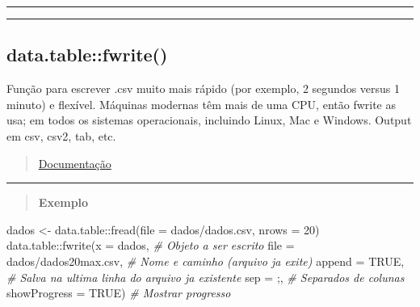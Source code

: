 \documentclass[
]{book}
\newenvironment{Shaded}{\begin{snugshade}}{\end{snugshade}}
\newcommand{\AttributeTok}[1]{\textcolor[rgb]{0.77,0.63,0.00}{#1}}
\newcommand{\CommentTok}[1]{\textcolor[rgb]{0.56,0.35,0.01}{\textit{#1}}}
\newcommand{\ConstantTok}[1]{\textcolor[rgb]{0.00,0.00,0.00}{#1}}
\newcommand{\DecValTok}[1]{\textcolor[rgb]{0.00,0.00,0.81}{#1}}
\newcommand{\FunctionTok}[1]{\textcolor[rgb]{0.00,0.00,0.00}{#1}}
\newcommand{\NormalTok}[1]{#1}
\newcommand{\OtherTok}[1]{\textcolor[rgb]{0.56,0.35,0.01}{#1}}
\newcommand{\SpecialCharTok}[1]{\textcolor[rgb]{0.00,0.00,0.00}{#1}}
\newcommand{\StringTok}[1]{\textcolor[rgb]{0.31,0.60,0.02}{#1}}
\theoremstyle{definition}
\theoremstyle{definition}
\theoremstyle{definition}
\theoremstyle{definition}
\theoremstyle{remark}
\begin{document}
\begin{center}\rule{0.5\linewidth}{0.5pt}\end{center}

\begin{center}\rule{0.5\linewidth}{0.5pt}\end{center}

\hypertarget{data.tablefwrite}{%
\subsection{data.table::fwrite()}\label{data.tablefwrite}}

Função para escrever .csv muito mais rápido (por exemplo, 2 segundos versus 1 minuto) e flexível. Máquinas modernas têm mais de uma CPU, então fwrite as usa; em todos os sistemas operacionais, incluindo Linux, Mac e Windows. Output em csv, csv2, tab, etc.

\begin{quote}
\href{https://www.rdocumentation.org/packages/data.table/versions/1.14.2/topics/fwrite}{Documentação}
\end{quote}

\begin{center}\rule{0.5\linewidth}{0.5pt}\end{center}

\begin{quote}
\textbf{Exemplo}
\end{quote}

\begin{Shaded}
\begin{Highlighting}[]
\NormalTok{dados }\OtherTok{\textless{}{-}}\NormalTok{ data.table}\SpecialCharTok{::}\FunctionTok{fread}\NormalTok{(}\AttributeTok{file =} \StringTok{\textquotesingle{}dados/dados.csv\textquotesingle{}}\NormalTok{, }\AttributeTok{nrows =} \DecValTok{20}\NormalTok{)}
\NormalTok{data.table}\SpecialCharTok{::}\FunctionTok{fwrite}\NormalTok{(}\AttributeTok{x =}\NormalTok{ dados,                     }\CommentTok{\# Objeto a ser escrito}
                   \AttributeTok{file =} \StringTok{\textquotesingle{}dados/dados20max.csv\textquotesingle{}}\NormalTok{, }\CommentTok{\# Nome e caminho (arquivo ja exite)}
                   \AttributeTok{append =} \ConstantTok{TRUE}\NormalTok{,                 }\CommentTok{\# Salva na ultima linha do arquivo ja existente}
                   \AttributeTok{sep =} \StringTok{\textquotesingle{};\textquotesingle{}}\NormalTok{,                     }\CommentTok{\# Separados de colunas}
                   \AttributeTok{showProgress =} \ConstantTok{TRUE}\NormalTok{)           }\CommentTok{\# Mostrar progresso}
\end{Highlighting}
\end{Shaded}
\end{document}
